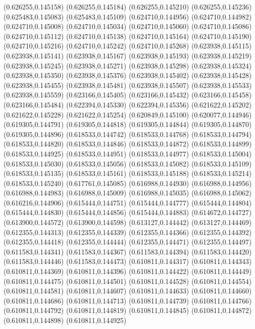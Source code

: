 (0.626255,0.145158)
(0.626255,0.145184)
(0.626255,0.145210)
(0.626255,0.145236)
(0.625483,0.145083)
(0.625483,0.145109)
(0.624710,0.144956)
(0.624710,0.144982)
(0.624710,0.145008)
(0.624710,0.145034)
(0.624710,0.145060)
(0.624710,0.145086)
(0.624710,0.145112)
(0.624710,0.145138)
(0.624710,0.145164)
(0.624710,0.145190)
(0.624710,0.145216)
(0.624710,0.145242)
(0.624710,0.145268)
(0.623938,0.145115)
(0.623938,0.145141)
(0.623938,0.145167)
(0.623938,0.145193)
(0.623938,0.145219)
(0.623938,0.145245)
(0.623938,0.145271)
(0.623938,0.145298)
(0.623938,0.145324)
(0.623938,0.145350)
(0.623938,0.145376)
(0.623938,0.145402)
(0.623938,0.145428)
(0.623938,0.145455)
(0.623938,0.145481)
(0.623938,0.145507)
(0.623938,0.145533)
(0.623938,0.145559)
(0.623166,0.145405)
(0.623166,0.145432)
(0.623166,0.145458)
(0.623166,0.145484)
(0.622394,0.145330)
(0.622394,0.145356)
(0.621622,0.145202)
(0.621622,0.145228)
(0.621622,0.145254)
(0.620849,0.145100)
(0.620077,0.144946)
(0.619305,0.144791)
(0.619305,0.144818)
(0.619305,0.144844)
(0.619305,0.144870)
(0.619305,0.144896)
(0.618533,0.144742)
(0.618533,0.144768)
(0.618533,0.144794)
(0.618533,0.144820)
(0.618533,0.144846)
(0.618533,0.144872)
(0.618533,0.144899)
(0.618533,0.144925)
(0.618533,0.144951)
(0.618533,0.144977)
(0.618533,0.145004)
(0.618533,0.145030)
(0.618533,0.145056)
(0.618533,0.145082)
(0.618533,0.145109)
(0.618533,0.145135)
(0.618533,0.145161)
(0.618533,0.145188)
(0.618533,0.145214)
(0.618533,0.145240)
(0.617761,0.145085)
(0.616988,0.144930)
(0.616988,0.144956)
(0.616988,0.144983)
(0.616988,0.145009)
(0.616988,0.145035)
(0.616988,0.145062)
(0.616216,0.144906)
(0.615444,0.144751)
(0.615444,0.144777)
(0.615444,0.144804)
(0.615444,0.144830)
(0.615444,0.144856)
(0.615444,0.144883)
(0.614672,0.144727)
(0.613900,0.144572)
(0.613900,0.144598)
(0.613127,0.144442)
(0.613127,0.144469)
(0.612355,0.144313)
(0.612355,0.144339)
(0.612355,0.144366)
(0.612355,0.144392)
(0.612355,0.144418)
(0.612355,0.144444)
(0.612355,0.144471)
(0.612355,0.144497)
(0.611583,0.144341)
(0.611583,0.144367)
(0.611583,0.144394)
(0.611583,0.144420)
(0.611583,0.144446)
(0.611583,0.144473)
(0.610811,0.144317)
(0.610811,0.144343)
(0.610811,0.144369)
(0.610811,0.144396)
(0.610811,0.144422)
(0.610811,0.144449)
(0.610811,0.144475)
(0.610811,0.144501)
(0.610811,0.144528)
(0.610811,0.144554)
(0.610811,0.144581)
(0.610811,0.144607)
(0.610811,0.144633)
(0.610811,0.144660)
(0.610811,0.144686)
(0.610811,0.144713)
(0.610811,0.144739)
(0.610811,0.144766)
(0.610811,0.144792)
(0.610811,0.144819)
(0.610811,0.144845)
(0.610811,0.144872)
(0.610811,0.144898)
(0.610811,0.144925)
